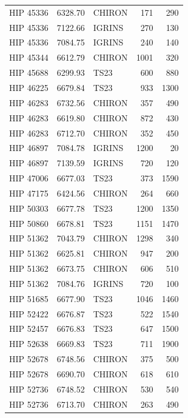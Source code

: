 \begin{scriptsize}
\begin{longtable}{|l|rlrr|}
   HIP 45336 &  6328.70 &     CHIRON &      171 &   290 \\
   HIP 45336 &  7122.66 &     IGRINS &      270 &   130 \\
   HIP 45336 &  7084.75 &     IGRINS &      240 &   140 \\
   HIP 45344 &  6612.79 &     CHIRON &     1001 &   320 \\
   HIP 45688 &  6299.93 &       TS23 &      600 &   880 \\
   HIP 46225 &  6679.84 &       TS23 &      933 &  1300 \\
   HIP 46283 &  6732.56 &     CHIRON &      357 &   490 \\
   HIP 46283 &  6619.80 &     CHIRON &      872 &   430 \\
   HIP 46283 &  6712.70 &     CHIRON &      352 &   450 \\
   HIP 46897 &  7084.78 &     IGRINS &     1200 &    20 \\
   HIP 46897 &  7139.59 &     IGRINS &      720 &   120 \\
   HIP 47006 &  6677.03 &       TS23 &      373 &  1590 \\
   HIP 47175 &  6424.56 &     CHIRON &      264 &   660 \\
   HIP 50303 &  6677.78 &       TS23 &     1200 &  1350 \\
   HIP 50860 &  6678.81 &       TS23 &     1151 &  1470 \\
   HIP 51362 &  7043.79 &     CHIRON &     1298 &   340 \\
   HIP 51362 &  6625.81 &     CHIRON &      947 &   200 \\
   HIP 51362 &  6673.75 &     CHIRON &      606 &   510 \\
   HIP 51362 &  7084.76 &     IGRINS &      720 &   100 \\
   HIP 51685 &  6677.90 &       TS23 &     1046 &  1460 \\
   HIP 52422 &  6676.87 &       TS23 &      522 &  1540 \\
   HIP 52457 &  6676.83 &       TS23 &      647 &  1500 \\
   HIP 52638 &  6669.83 &       TS23 &      711 &  1900 \\
   HIP 52678 &  6748.56 &     CHIRON &      375 &   500 \\
   HIP 52678 &  6690.70 &     CHIRON &      618 &   610 \\
   HIP 52736 &  6748.52 &     CHIRON &      530 &   540 \\
   HIP 52736 &  6713.70 &     CHIRON &      263 &   490 \\

\end{longtable}
\end{scriptsize}
